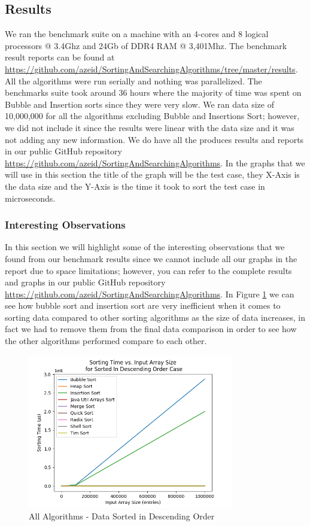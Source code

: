 \subsection{Results}
We ran the benchmark suite on a machine with an 4-cores and 8 logical processors @ 3.4Ghz and 24Gb of DDR4 RAM @ 3,401Mhz. The benchmark result reports can be found at \url{https://github.com/azeid/SortingAndSearchingAlgorithms/tree/master/results}. All the algorithms were run serially and nothing was parallelized. The benchmarks suite took around 36 hours where the majority of time was spent on Bubble and Insertion sorts since they were very slow. We ran data size of 10,000,000 for all the algorithms excluding Bubble and Insertions Sort; however, we did not include it since the results were linear with the data size and it was not adding any new information. We do have all the produces results and reports in our public GitHub repository \url{https://github.com/azeid/SortingAndSearchingAlgorithms}. In the graphs that we will use in this section the title of the graph will be the test case, they X-Axis is the data size and the Y-Axis is the time it took to sort the test case in microseconds.

\subsubsection{Interesting Observations}
In this section we will highlight some of the interesting observations that we found from our benchmark results since we cannot include all our graphs in the report due to space limitations; however, you can refer to the complete results and graphs in our public GitHub repository \url{https://github.com/azeid/SortingAndSearchingAlgorithms}. In Figure \ref{fig:allInDescendingOrder} we can see how bubble sort and insertion sort are very inefficient when it comes to sorting data compared to other sorting algorithms as the size of data increases, in fact we had to remove them from the final data comparison in order to see how the other algorithms performed compare to each other.

\begin{figure}[H]
\centering
\includegraphics[width=9cm]{figures/plots_all_algs/sorting_time_vs_input_array_size_SortedInDescendingOrderCase.png}
\caption{All Algorithms - Data Sorted in Descending Order}
\label{fig:allInDescendingOrder}
\end{figure}

